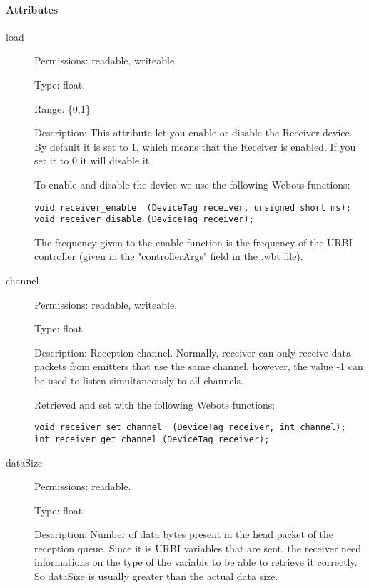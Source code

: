 \paragraph{Attributes}
\label{webots.uobjects.robotdevices.receiver.attributes}%

\noindent
\begin{description}
\item[{load}]     Permissions: readable, writeable.


  Type: float.


  Range: \{0,1\}


  Description: This attribute let you enable or disable the Receiver
  device.  By default it is set to 1, which means that the Receiver is
  enabled. If you set it to 0 it will disable it.


          To enable and disable the device we use the following Webots functions:


\begin{lstlisting}[firstnumber=1,]
void receiver_enable  (DeviceTag receiver, unsigned short ms);
void receiver_disable (DeviceTag receiver);
\end{lstlisting}

          The frequency given to the enable function is the frequency of the
          URBI controller (given in the "controllerArgs" field in the .wbt file).

\item[{         channel
 }]            Permissions: readable, writeable.


 Type: float.


 Description: Reception channel. Normally, receiver can only receive
 data packets from emitters that use the same channel, however, the
 value -{}1 can be used to listen simultaneously to all channels.


          Retrieved and set with the following Webots functions:


\begin{lstlisting}[firstnumber=1,]
void receiver_set_channel  (DeviceTag receiver, int channel);
int receiver_get_channel (DeviceTag receiver);
\end{lstlisting}
\item[{         dataSize
 }]            Permissions: readable.


 Type: float.


 Description: Number of data bytes present in the head packet of the
 reception queue. Since it is URBI variables that are sent, the
 receiver need informations on the type of the variable to be able to
 retrieve it correctly. So dataSize is usually greater than the actual
 data size.



\end{description}
